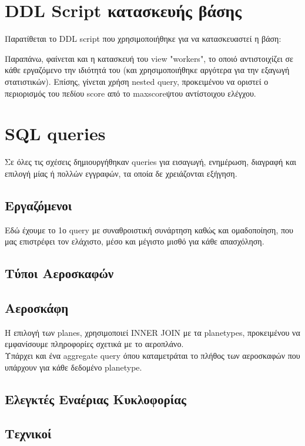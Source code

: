 \documentclass[a4paper]{article}
\begin{document}
\section{DDL Script κατασκευής βάσης}
Παρατίθεται το DDL script που χρησιμοποιήθηκε για να κατασκευαστεί η βάση:

Παραπάνω, φαίνεται και η κατασκευή του view "workers", το οποιό αντιστοιχίζει
σε κάθε εργαζόμενο την ιδιότητά του (και χρησιμοποιήθηκε αργότερα για την
εξαγωγή στατιστικών). Επίσης, γίνεται χρήση nested query, προκειμένου να
οριστεί ο περιορισμός του πεδίου score από το maxscoreψτου αντίστοιχου ελέγχου.



\section{SQL queries}
Σε όλες τις σχέσεις δημιουργήθηκαν queries για εισαγωγή, ενημέρωση,
διαγραφή και επιλογή μίας ή πολλών εγγραφών, τα οποία δε χρειάζονται
εξήγηση.
\subsection{Εργαζόμενοι}
Εδώ έχουμε το 1ο query με συναθροιστική συνάρτηση καθώς και
ομαδοποίηση, που μας επιστρέφει τον ελάχιστο, μέσο και μέγιστο μισθό για κάθε
απασχόληση.
    
\subsection{Τύποι Αεροσκαφών}
    
\subsection{Αεροσκάφη}
H επιλογή των planes, χρησιμοποιεί INNER JOIN με τα planetypes, προκειμένου να
εμφανίσουμε πληροφορίες σχετικά με το αεροπλάνο.\\
Υπάρχει και ένα aggregate query όπου καταμετράται το πλήθος των αεροσκαφών που
υπάρχουν για κάθε δεδομένο planetype.
    
\subsection{Ελεγκτές Εναέριας Κυκλοφορίας}
    
\subsection{Τεχνικοί}
    
\end{document}
